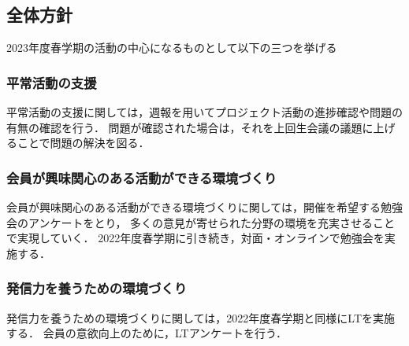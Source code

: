 \subsection*{全体方針}


2023年度春学期の活動の中心になるものとして以下の三つを挙げる

\subsubsection*{平常活動の支援}
平常活動の支援に関しては，週報を用いてプロジェクト活動の進捗確認や問題の有無の確認を行う．
問題が確認された場合は，それを上回生会議の議題に上げることで問題の解決を図る．

\subsubsection*{会員が興味関心のある活動ができる環境づくり}
会員が興味関心のある活動ができる環境づくりに関しては，開催を希望する勉強会のアンケートをとり，
多くの意見が寄せられた分野の環境を充実させることで実現していく．
2022年度春学期に引き続き，対面・オンラインで勉強会を実施する．

\subsubsection*{発信力を養うための環境づくり}
発信力を養うための環境づくりに関しては，2022年度春学期と同様にLTを実施する．
会員の意欲向上のために，LTアンケートを行う．

